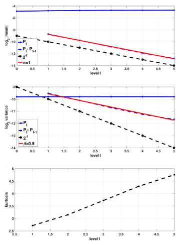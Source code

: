\begin{figure}[htb]
	\centering %
	\begin{subfigure}{0.5\textwidth}
		\includegraphics[width=\linewidth]{./figures/MLMC_density_Heston_estimation/OU/density_option_set1_L_0_4_steps_L_6_N_10_6_beta_32/density_option_set1_L_0_2_steps_L_6_N_10_6_weak}
		\caption{}
		\label{fig:hest_density_weak}
	\end{subfigure}\hfil %
	\begin{subfigure}{0.5\textwidth}
		\includegraphics[width=\linewidth]{./figures/MLMC_density_Heston_estimation/OU/density_option_set1_L_0_4_steps_L_6_N_10_6_beta_32/density_option_set1_L_0_2_steps_L_6_N_10_6_strong}
		\caption{}
		\label{fig:hest_density_strong}
	\end{subfigure}\hfil %
	\begin{subfigure}{0.5\textwidth}
		\includegraphics[width=\linewidth]{./figures/MLMC_density_Heston_estimation/OU/density_option_set1_L_0_2_steps_L_5_N_10_5/density_option_set1_L_0_2_steps_L_5_N_10_5_kurt}

\end{subfigure}
\end{figure}
